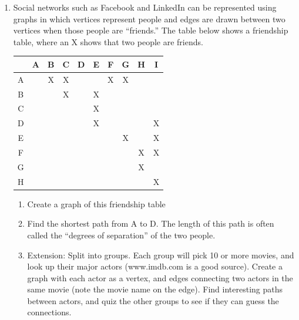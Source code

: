 \begin{enumerate}[start=18]
\item Social networks such as Facebook and LinkedIn can be represented using graphs in which vertices represent people and edges are drawn between two vertices when those people are ``friends.''   The table below shows a friendship table, where an X shows that two people are friends.
\begin{center}
\begin{tabular}{|c|c|c|c|c|c|c|c|c|c|}
\hline
&A&B&C&D&E&F&G&H&I\\
\hline
A & \cellcolor{yellow}&X&X&&&X&X&&\\
\hline
B& \cellcolor{yellow}& \cellcolor{yellow}&X&&X&&&&\\
\hline
C& \cellcolor{yellow}& \cellcolor{yellow}& \cellcolor{yellow}&&X&&&&\\
\hline
D& \cellcolor{yellow}& \cellcolor{yellow}& \cellcolor{yellow}& \cellcolor{yellow}&X&&&&X\\
\hline
E& \cellcolor{yellow}& \cellcolor{yellow}& \cellcolor{yellow}& \cellcolor{yellow}& \cellcolor{yellow}&&X&&X\\
\hline
F& \cellcolor{yellow}& \cellcolor{yellow}& \cellcolor{yellow}& \cellcolor{yellow}& \cellcolor{yellow}& \cellcolor{yellow}&&X&X\\
\hline
G& \cellcolor{yellow}& \cellcolor{yellow}& \cellcolor{yellow}& \cellcolor{yellow}& \cellcolor{yellow}& \cellcolor{yellow}& \cellcolor{yellow}&X&\\
\hline
H& \cellcolor{yellow}& \cellcolor{yellow}& \cellcolor{yellow}& \cellcolor{yellow}& \cellcolor{yellow}& \cellcolor{yellow}& \cellcolor{yellow}& \cellcolor{yellow}&X\\
\hline
\end{tabular}
\par{}\label{tab:graphtheory-dor1-tab04}%

\end{center}
\begin{enumerate}
\item	Create a graph of this friendship table
\item	Find the shortest path from A to D.  The length of this path is often called the ``degrees of separation'' of the two people.
\item	Extension:  Split into groups.  Each group will pick 10 or more movies, and look up their major actors (www.imdb.com is a good source).  Create a graph with each actor as a vertex, and edges connecting two actors in the same movie (note the movie name on the edge).  Find interesting paths between actors, and quiz the other groups to see if they can guess the connections.\\
\end{enumerate}


\end{enumerate}
